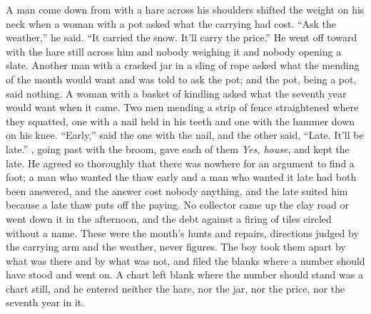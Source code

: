 A man come down from  with a hare across his shoulders shifted the weight on his neck when a woman with a pot asked what the carrying had cost. “Ask the weather,” he said. “It carried the snow. It'll carry the price.” He went off toward  with the hare still across him and nobody weighing it and nobody opening a slate. Another man with a cracked jar in a sling of rope asked what the mending of the month would want and was told to ask the pot; and the pot, being a pot, said nothing. A woman with a basket of kindling asked what the seventh year would want when it came. Two men mending a strip of fence straightened where they squatted, one with a nail held in his teeth and one with the hammer down on his knee. “Early,” said the one with the nail, and the other said, “Late. It'll be late.” , going past with the broom, gave each of them \emph{Yes, house}, and kept the late. He agreed so thoroughly that there was nowhere for an argument to find a foot; a man who wanted the thaw early and a man who wanted it late had both been answered, and the answer cost nobody anything, and the late suited him because a late thaw puts off the paying. No collector came up the clay road or went down it in the afternoon, and the debt against a firing of tiles circled without a name. These were the month's hunts and repairs, directions judged by the carrying arm and the weather, never figures. The boy took them apart by what was there and by what was not, and filed the blanks where a number should have stood and went on. A chart left blank where the number should stand was a chart still, and he entered neither the hare, nor the jar, nor the price, nor the seventh year in it.

\scenebreak

